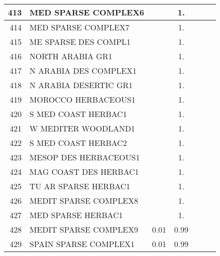 {{\begin{tabular}{||r|l||c|c|c|c|c||}
 \hline
         413  & MED SPARSE COMPLEX6                                          &       &  1.   &       &       \\
 \hline
         414  & MED SPARSE COMPLEX7                                          &       &  1.   &       &       \\
 \hline
         415  & ME SPARSE DES COMPL1                                         &       &  1.   &       &       \\
 \hline
         416  & NORTH ARABIA GR1                                             &       &  1.   &       &       \\
 \hline
         417  & N ARABIA DES COMPLEX1                                        &       &  1.   &       &       \\
 \hline
         418  & N ARABIA DESERTIC GR1                                        &       &  1.   &       &       \\
 \hline
         419  & MOROCCO HERBACEOUS1                                          &       &  1.   &       &       \\
 \hline
         420  & S MED COAST HERBAC1                                          &       &  1.   &       &       \\
 \hline
         421  & W MEDITER WOODLAND1                                          &       &  1.   &       &       \\
 \hline
         422  & S MED COAST HERBAC2                                          &       &  1.   &       &       \\
 \hline
         423  & MESOP DES HERBACEOUS1                                        &       &  1.   &       &       \\
 \hline
         424  & MAG COAST DES HERBAC1                                        &       &  1.   &       &       \\
 \hline
         425  & TU AR SPARSE HERBAC1                                         &       &  1.   &       &       \\
 \hline
         426  & MEDIT SPARSE COMPLEX8                                        &       &  1.   &       &       \\
 \hline
         427  & MED SPARSE HERBAC1                                           &       &  1.   &       &       \\
 \hline
         428  & MEDIT SPARSE COMPLEX9                                        &  0.01 &  0.99 &       &       \\
 \hline
         429  & SPAIN SPARSE COMPLEX1                                        &  0.01 &  0.99 &       &       \\

\end{tabular}}}
